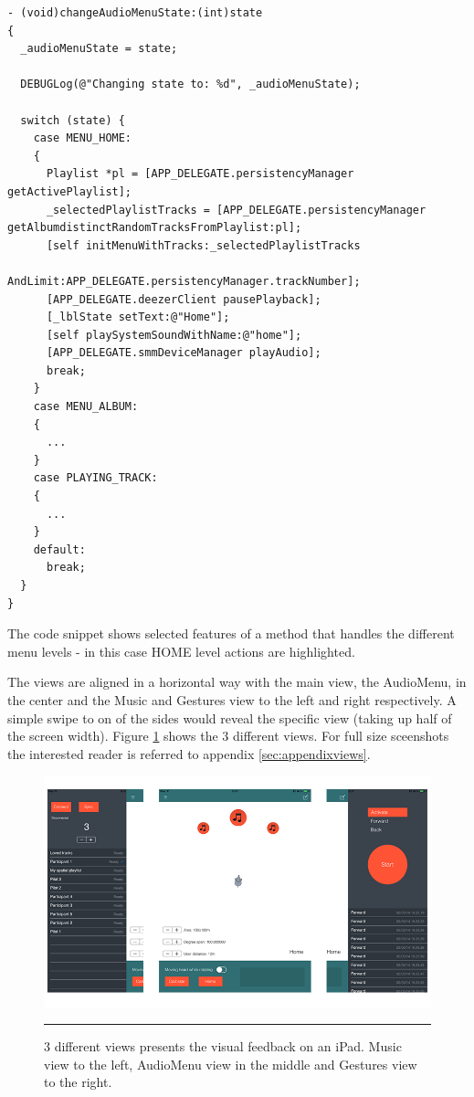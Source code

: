 \begin{lstlisting}
- (void)changeAudioMenuState:(int)state
{
  _audioMenuState = state;
  
  DEBUGLog(@"Changing state to: %d", _audioMenuState);
  
  switch (state) {
    case MENU_HOME:
    {
      Playlist *pl = [APP_DELEGATE.persistencyManager getActivePlaylist];
      _selectedPlaylistTracks = [APP_DELEGATE.persistencyManager getAlbumdistinctRandomTracksFromPlaylist:pl];
      [self initMenuWithTracks:_selectedPlaylistTracks 
                      AndLimit:APP_DELEGATE.persistencyManager.trackNumber];
      [APP_DELEGATE.deezerClient pausePlayback];
      [_lblState setText:@"Home"];
      [self playSystemSoundWithName:@"home"];
      [APP_DELEGATE.smmDeviceManager playAudio];
      break;
    }
    case MENU_ALBUM:
    {
      ...
    }
    case PLAYING_TRACK:
    {
      ...
    }
    default:
      break;
  }
}
\end{lstlisting}

The code snippet shows selected features of a method that handles the different menu levels - in this case HOME level actions are highlighted.

The views are aligned in a horizontal way with the main view, the AudioMenu, in the center and the Music and Gestures view to the left and right respectively. A simple swipe to on of the sides would reveal the specific view (taking up half of the screen width). Figure \ref{fig:implementationviews} shows the 3 different views. For full size sceenshots the interested reader is referred to appendix \ref{sec:appendixviews}.

\begin{figure}[t]
  \centering
    \includegraphics[width=\textwidth,height=\textheight,keepaspectratio]{./Figures/views_2.png}
    \rule{35em}{1pt}
  \caption[iOS views]{3 different views presents the visual feedback on an iPad. Music view to the left, AudioMenu view in the middle and Gestures view to the right.}
  \label{fig:implementationviews}
\end{figure}

